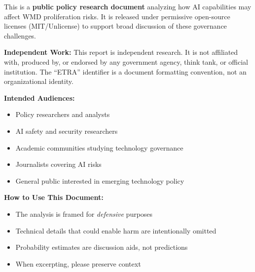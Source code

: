 \documentclass[11pt,letterpaper]{article}
\begin{document}
{\small
\begin{tcolorbox}[enhanced, colback=lightgray, colframe=scienceteal!60, boxrule=1pt, arc=3pt,
  left=10pt, right=10pt, top=10pt, bottom=10pt]
This is a \textbf{public policy research document} analyzing how AI capabilities may affect WMD proliferation risks. It is released under permissive open-source licenses (MIT/Unlicense) to support broad discussion of these governance challenges.

\vspace{0.5em}
\textbf{Independent Work:} This report is independent research. It is not affiliated with, produced by, or endorsed by any government agency, think tank, or official institution. The ``ETRA'' identifier is a document formatting convention, not an organizational identity.
\end{tcolorbox}

\vspace{0.2cm}

\begin{minipage}[t]{0.48\textwidth}
\textbf{Intended Audiences:}
\begin{itemize}[nosep]
  \item Policy researchers and analysts
  \item AI safety and security researchers
  \item Academic communities studying technology governance
  \item Journalists covering AI risks
  \item General public interested in emerging technology policy
\end{itemize}
\end{minipage}
\hfill
\begin{minipage}[t]{0.48\textwidth}
\textbf{How to Use This Document:}
\begin{itemize}[nosep]
  \item The analysis is framed for \textit{defensive} purposes
  \item Technical details that could enable harm are intentionally omitted
  \item Probability estimates are discussion aids, not predictions
  \item When excerpting, please preserve context
\end{itemize}
\end{minipage}

\vspace{0.3cm}

}
\end{document}
